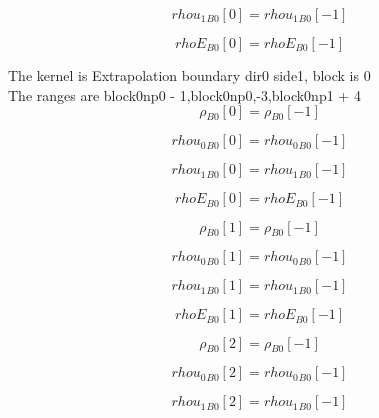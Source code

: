 \documentclass{article}
\begin{document}
\begin{dmath}{rhou_{1}{_{B0}}}[{0}] = {rhou_{1}{_{B0}}}[{-1}]\end{dmath}

\begin{dmath}{rhoE{_{B0}}}[{0}] = {rhoE{_{B0}}}[{-1}]\end{dmath}

\noindent The kernel is Extrapolation boundary dir0 side1, block is 0\\\noindent The ranges are block0np0 - 1,block0np0,-3,block0np1 + 4\\\begin{dmath}{\rho{_{B0}}}[{0}] = {\rho{_{B0}}}[{-1}]\end{dmath}

\begin{dmath}{rhou_{0}{_{B0}}}[{0}] = {rhou_{0}{_{B0}}}[{-1}]\end{dmath}

\begin{dmath}{rhou_{1}{_{B0}}}[{0}] = {rhou_{1}{_{B0}}}[{-1}]\end{dmath}

\begin{dmath}{rhoE{_{B0}}}[{0}] = {rhoE{_{B0}}}[{-1}]\end{dmath}

\begin{dmath}{\rho{_{B0}}}[{1}] = {\rho{_{B0}}}[{-1}]\end{dmath}

\begin{dmath}{rhou_{0}{_{B0}}}[{1}] = {rhou_{0}{_{B0}}}[{-1}]\end{dmath}

\begin{dmath}{rhou_{1}{_{B0}}}[{1}] = {rhou_{1}{_{B0}}}[{-1}]\end{dmath}

\begin{dmath}{rhoE{_{B0}}}[{1}] = {rhoE{_{B0}}}[{-1}]\end{dmath}

\begin{dmath}{\rho{_{B0}}}[{2}] = {\rho{_{B0}}}[{-1}]\end{dmath}

\begin{dmath}{rhou_{0}{_{B0}}}[{2}] = {rhou_{0}{_{B0}}}[{-1}]\end{dmath}

\begin{dmath}{rhou_{1}{_{B0}}}[{2}] = {rhou_{1}{_{B0}}}[{-1}]\end{dmath}
\end{document}
